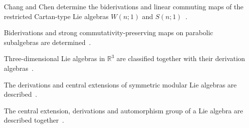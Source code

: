 Chang and Chen determine the biderivations and linear commuting maps of the restricted Cartan-type Lie algebras $W(n;1)$ and $S(n;1)$~\cite{WlBiderivationsAndLinearCommutin2020}.

Biderivations and strong commutativity-preserving maps on parabolic subalgebras are determined~\cite{WlBiderivationsAndStrongCommutat2020}.

Three-dimensional Lie algebras in $\mathbb{R}^3$ are classified together with their derivation algebras~\cite{WlClassificationOfThreeDimension2020}.

The derivations and central extensions of symmetric modular Lie algebras are described~\cite{WlDerivationsAndCentralExtension2020}.

The central extension, derivations and automorphism group of a Lie algebra are described together~\cite{WlCentralExtensionDerivationsAnd2020}.
